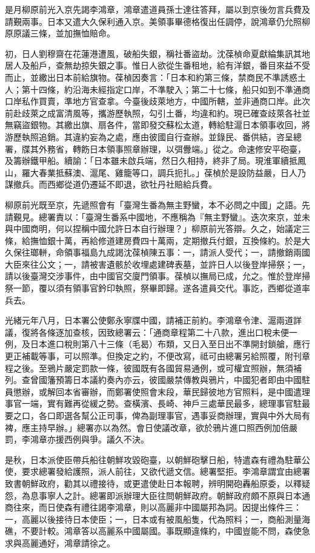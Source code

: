 \begin{pinyinscope}
是月柳原前光入京先謁李鴻章，鴻章遣道員孫士達往答拜，屬以到京後勿言兵費及請覲兩事。日本又遣大久保利通入京。美領事畢德格復出任調停，說鴻章仍允照柳原原議三條，並加撫恤賠命。

初，日人劉穆齋在花蓮港遭風，破船失銀，稱社番盜劫。沈葆楨命夏獻綸集訊其地居人及船戶，查無劫掠失銀之事。惟日人欲從生番租地，給有洋銀，番目來益不受而止，並繳出日本前給旗物。葆楨因奏言：「日本和約第三條，禁商民不準誘惑土人；第十四條，約沿海未經指定口岸，不準駛入；第二十七條，船只如到不準通商口岸私作買賣，準地方官查拿。今臺後歧萊地方，中國所轄，並非通商口岸。此次前赴歧萊之成富清風等，攜游歷執照，勾引土番，均違和約。現已確查歧萊各社並無竊盜銀物。其繳出旗、扇各件，當即發交蘇松太道，轉給駐滬日本領事收回，將游歷執照追銷。其違約妄為之處，應由彼國自行查辦。並錄民、番供結，咨呈總署，牒其外務省，轉飭日本領事照章辦理，以弭釁端。」從之。命速修安平砲臺，及籌辦鐵甲船。續諭：「日本雖未啟兵端，然日久相持，終非了局。現淮軍續抵鳳山，羅大春業抵蘇澳、滬尾、雞籠等口，調兵扼扎。」葆楨於是設防益嚴，日人乃謀撤兵。而西鄉從道仍遷延不即退，欲牡丹社賠給兵費。

柳原前光既至京，先遞照會有「臺灣生番為無主野蠻，本不必問之中國」之語。先請覲見。總署責以：「臺灣生番系中國地，不應稱為『無主野蠻』。迭次來京，並未與中國商明，何以捏稱中國允許日本自行辦理？」柳原前光答辯。久之，始議定三條，給撫恤銀十萬，再給修道建房費四十萬兩，定期撤兵付銀，互換條約。於是大久保往瑯軿，命領事福島九成謁沈葆楨陳五事：一，請派人受代；一，請撤銷兩國大臣來往公文；一，請被害遺骸於收埋處建碑表墓，並許日人以後登岸掃祭；一，請以後臺灣交涉事件，由中國官交廈門領事。葆楨以撫局已成，允之。惟於登岸掃祭一節，覆以須有領事官鈐印執照，祭畢即歸。遂各遣員交代。事訖，西鄉從道率兵去。

光緒元年八月，日本署公使鄭永寧牒中國，請補正前約。李鴻章令津、滬兩道詳議，復將各條逐加查核，因致總署云：「通商章程第二十八款，進出口稅未便一例，及日本進口稅則第八十三條（毛曷）布類，又日入至日出不準開封鎖艙，應行更正補載等事，可以照準。但換定之約，不便改寫，祗可由總署另給照覆，附刊章程之後。至鴉片嚴定罰款一條，彼國既有各國貿易通例，或可權宜照辦，無須補列。查曾國籓預籌日本議約奏內亦云，彼國嚴禁傳教與鴉片，中國犯者即由中國駐員懲辦，或解回本省審辦，而鄭署使照會末段，華民歸彼地方官照料，是中國遣理事官一端，實有難再從緩之勢。查橫濱、長崎、神戶三處華民最多，總理事官駐最要之口，各口即選各幫公正司事，俾為副理事官，遇事妥商辦理，實與中外大局有裨，應主持早辦。」總署亦以為然。會日使議改章，欲於鴉片進口照西例加倍嚴罰，李鴻章亦援西例與爭。議久不決。

是秋，日本派使臣帶兵船往朝鮮攻毀砲臺，以朝鮮砲擊日船，特遣森有禮為駐華公使，要求總署發給護照，派人前往，又欲代遞文信。總署堅拒。李鴻章謂宜由總署致書朝鮮政府，勸其以禮接待，或更遣使赴日本報聘，辨明開砲轟船原委，以釋疑怨，為息事寧人之計。總署即派辦理大臣往問朝鮮政府。朝鮮政府頗不原與日本通商往來，而日使森有禮往謁李鴻章，則以高麗非中國屬邦為詞。因提出條件三：一，高麗以後接待日本使臣；一，日本或有被風船隻，代為照料；一，商船測量海礁，不要計較。鴻章答以高麗系中國屬國。事既顯違條約，中國豈能不問，森使急求與高麗通好，鴻章請徐之。


\end{pinyinscope}
